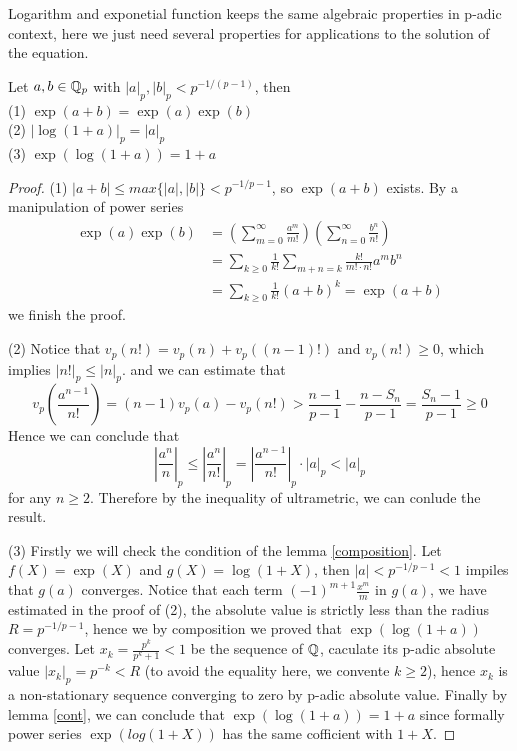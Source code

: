 Logarithm and exponetial function keeps the same algebraic properties in p-adic context, here we just need several properties for applications to the solution of the equation.
\begin{proposition}
    Let \(a,b \in \mathbb{Q}_p\) with \(|a|_p, |b|_p < p^{-1/(p-1)} \), then\\
    (1) \(\exp (a+b)  = \exp (a) \exp(b)\) \\
    (2) \(|\log(1+a)|_p = |a|_p\)\\
    (3) \(\exp (\log (1+a)) = 1+a\)
    \begin{proof}
        (1) \(|a+b|\leq max \{|a|,|b|\}<p^{-1/p-1}\), so \(\exp(a+b)\) exists. By a manipulation of power series
        \begin{align*}
           \exp(a)\exp(b) &= (\sum_{m=0}^{\infty}\frac{a^m}{m!})(\sum_{n=0}^{\infty}\frac{b^n}{n!}) \\
           &= \sum_{k\geq 0}\frac{1}{k!}\sum_{m+n=k}\frac{k!}{m!\cdot n!}a^mb^n\\
           &= \sum_{k\geq 0}\frac{1}{k!}(a+b)^k = \exp(a+b)
        \end{align*}
        we finish the proof.

        (2) Notice that \(v_p(n!)=v_p(n)+v_p((n-1)!)\) and \(v_p(n!)\geq 0\), which implies \(|n!|_p \leq |n|_p\). and we can estimate that
        \[v_p(\frac{a^{n-1}}{n!}) = (n-1)v_p(a)-v_p(n!) > \frac{n-1}{p-1} - \frac{n-S_n}{p-1} = \frac{S_n-1}{p-1} \geq 0\]
        Hence we can conclude that 
        \[|\frac{a^n}{n}|_p \leq |\frac{a^n}{n!}|_p = |\frac{a^{n-1}}{n!}|_p \cdot|a|_p < |a|_p\]        
        for any \(n \geq 2\). Therefore by the inequality of ultrametric, we can conlude the result.

        (3) Firstly we will check the condition of the lemma \ref{composition}. Let \(f(X) = \exp(X)\) and \(g(X) = \log(1+X)\), then \(|a| < p^{-1/p-1} <1\) impiles that \(g(a)\) converges. Notice that each term \((-1)^{m+1}\frac{x^m}{m}\) in \(g(a)\), we have estimated in the proof of (2), the absolute value is strictly less than the radius \(R = p^{-1/p-1}\), hence we by composition we proved that \(\exp(\log(1+a))\) converges. Let \(x_k = \frac{p^k}{p^k+1} <1\) be the sequence of \(\mathbb{Q}\), caculate its p-adic absolute value \(|x_k|_p=p^{-k} < R\) (to avoid the equality here, we convente \(k \geq 2\)), hence \(x_k\) is a non-stationary sequence converging to zero by p-adic absolute value. Finally by lemma \ref{cont}, we can conclude that \( \exp(\log(1+a)) = 1+a\) since formally power series \(\exp(log(1+X))\) has the same cofficient with \(1+X\).
    \end{proof}
\end{proposition}

